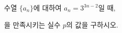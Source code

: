 수열 $\{a_n\}$에 대하여 $a_n=3^{3n-2}$일 때,\par\smallskip{}\par\smallskip\noindent 을 만족시키는 실수 $p$의 값을 구하시오.
